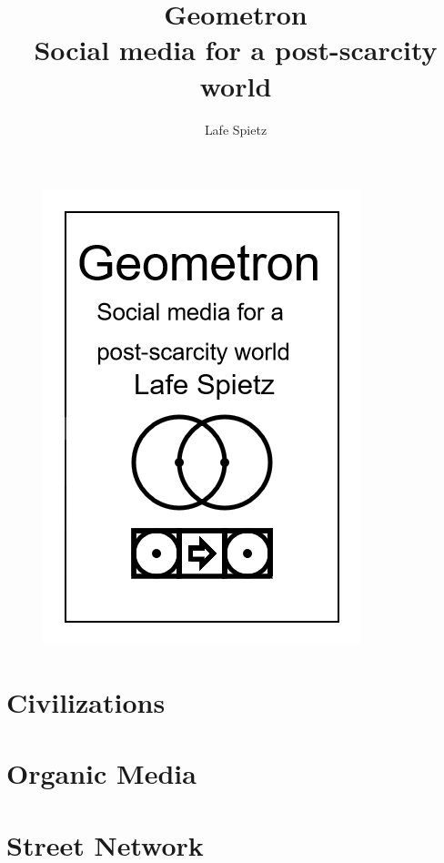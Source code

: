 \documentclass[ebook,12pt,openany,onesided]{memoir} %
\title{Geometron \\ Social media for a post-scarcity world}
\author{Lafe Spietz}
\begin{document}
\frontmatter
\begin{figure}[htbp]
\centering
\includegraphics{cover.png}
\end{figure}

\clearpage

\clearpage

\newpage
\thispagestyle{empty}
\mbox{}

\maketitle

\tableofcontents

\listoffigures 

%

\mainmatter

\chapter{Civilizations}

\chapter{Organic Media}

\chapter{Street Network}

\end{document}
